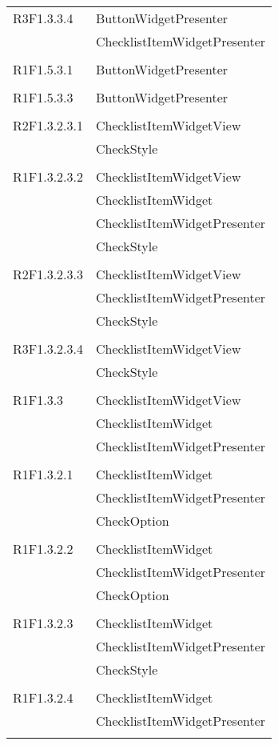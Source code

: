 \begin{center}
\begin{longtable}{|p{7cm}|p{7cm}|}
		R3F1.3.3.4 & ButtonWidgetPresenter \\ & ChecklistItemWidgetPresenter \\ & \\ \hline
		R1F1.5.3.1 & ButtonWidgetPresenter \\ & \\ \hline
		R1F1.5.3.3 & ButtonWidgetPresenter \\ & \\ \hline
		R2F1.3.2.3.1 & ChecklistItemWidgetView \\ & CheckStyle \\ & \\ \hline
		R1F1.3.2.3.2 & ChecklistItemWidgetView \\ & ChecklistItemWidget \\ & ChecklistItemWidgetPresenter \\ & CheckStyle \\ & \\ \hline
		R2F1.3.2.3.3 & ChecklistItemWidgetView \\ & ChecklistItemWidgetPresenter \\ & CheckStyle \\ & \\ \hline
		R3F1.3.2.3.4 & ChecklistItemWidgetView \\ & CheckStyle \\ & \\ \hline
		R1F1.3.3 & ChecklistItemWidgetView \\ & ChecklistItemWidget \\ & ChecklistItemWidgetPresenter \\ & \\ \hline
		R1F1.3.2.1 & ChecklistItemWidget \\ & ChecklistItemWidgetPresenter \\ & CheckOption \\ & \\ \hline
		R1F1.3.2.2 & ChecklistItemWidget \\ & ChecklistItemWidgetPresenter \\ & CheckOption \\ & \\ \hline
		R1F1.3.2.3 & ChecklistItemWidget \\ & ChecklistItemWidgetPresenter \\ & CheckStyle \\ & \\ \hline
		R1F1.3.2.4 & ChecklistItemWidget \\ & ChecklistItemWidgetPresenter \\ & \\ \hline

\end{longtable}
\end{center}
